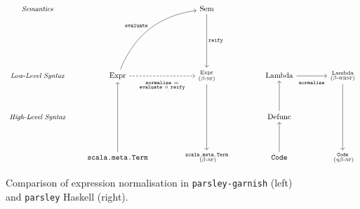 \documentclass[../../../main.tex]{subfiles}
\begin{document}
\begin{figure}[htbp]
\begin{equation*}
  \begin{tikzcd}[row sep=3.5em,column sep=2em]
    {\small \textit{Semantics}}         &                                                                                                                                                           &  & \text{Sem} \arrow[dd, "\texttt{reify}"]               &  &                          &  &                                                            \\
                                        &                                                                                                                                                           &  &                                                       &  &                          &  &                                                            \\
    {\small \textit{Low-Level Syntax}}  & \text{Expr} \arrow[rruu, "\texttt{evaluate}", bend left] \arrow[rr, "\substack{\texttt{normalise}\ = \\ \texttt{evaluate}\ \circ\ \texttt{reify}}"' {yshift=-1ex}, dashed] &  & \substack{\text{Expr} \\ \text{($\beta$-\textsc{nf})}} \arrow[dd]          &  & \text{Lambda} \arrow[rr, "\texttt{normalise}"' {yshift=-1ex}] &  & \substack{\text{Lambda} \\ \text{($\beta$-\textsc{whnf})}} \arrow[dd] \\
    {\small \textit{High-Level Syntax}} &                                                                                                                                                           &  &                                                       &  & \text{Defunc} \arrow[u]  &  &                                                            \\
                                        & \texttt{scala.meta.Term} \arrow[uu]                                                                                                                       &  & \substack{\texttt{scala.meta.Term} \\ \text{ ($\beta$-\textsc{nf})}} &  & \texttt{Code} \arrow[u]  &  & \substack{\texttt{Code} \\ \text{ ($\eta\beta$-\textsc{nf})}}            
    \end{tikzcd}
  \end{equation*}
  \caption{Comparison of expression normalisation in \texttt{parsley-garnish} (left) and \texttt{parsley} Haskell (right).}
  \label{fig:nbe-vs-parsley}
\end{figure}

\end{document}
